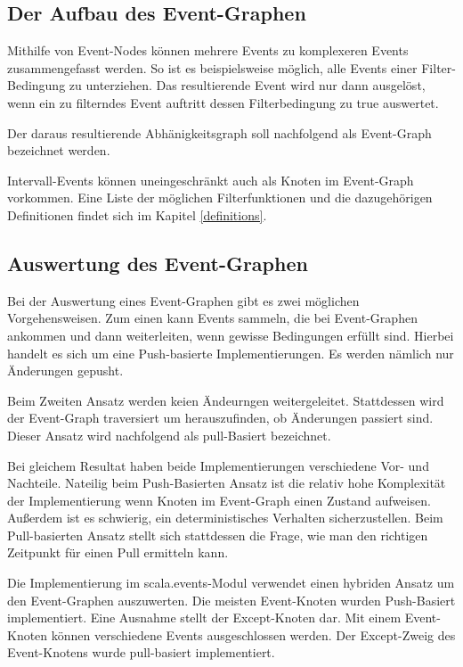 \subsection{Der Aufbau des Event-Graphen}
Mithilfe von Event-Nodes können mehrere Events zu komplexeren Events
zusammengefasst werden. So ist es beispielsweise möglich, alle Events einer
Filter-Bedingung zu unterziehen. Das resultierende Event wird nur dann
ausgelöst, wenn ein zu filterndes Event auftritt dessen Filterbedingung zu true
auswertet. 

Der daraus resultierende Abhänigkeitsgraph soll nachfolgend als Event-Graph
bezeichnet werden.

Intervall-Events können uneingeschränkt auch als Knoten im Event-Graph
vorkommen. Eine Liste der möglichen Filterfunktionen und die dazugehörigen
Definitionen findet sich im Kapitel \ref{definitions}.

\subsection{Auswertung des Event-Graphen}

Bei der Auswertung eines Event-Graphen gibt es zwei möglichen Vorgehensweisen.
Zum einen kann Events sammeln, die bei Event-Graphen ankommen und dann
weiterleiten, wenn gewisse Bedingungen erfüllt sind. Hierbei handelt es sich um
eine Push-basierte Implementierungen. Es werden nämlich nur Änderungen gepusht.

Beim Zweiten Ansatz werden keien Ändeurngen weitergeleitet. Stattdessen wird der
Event-Graph traversiert um herauszufinden, ob Änderungen passiert sind. Dieser
Ansatz wird nachfolgend als pull-Basiert bezeichnet.

Bei gleichem Resultat haben beide Implementierungen verschiedene Vor- und
Nachteile. Nateilig beim Push-Basierten Ansatz ist die relativ hohe Komplexität
der Implementierung wenn Knoten im Event-Graph einen Zustand aufweisen.
Außerdem ist es schwierig, ein deterministisches Verhalten sicherzustellen. Beim
Pull-basierten Ansatz stellt sich stattdessen die Frage, wie man den richtigen
Zeitpunkt für einen Pull ermitteln kann. 

Die Implementierung im scala.events-Modul verwendet einen hybriden Ansatz um den
Event-Graphen auszuwerten. Die meisten Event-Knoten wurden Push-Basiert
implementiert. Eine Ausnahme stellt der Except-Knoten dar. Mit einem
Event-Knoten können verschiedene Events ausgeschlossen werden. Der Except-Zweig
des Event-Knotens wurde pull-basiert implementiert.

